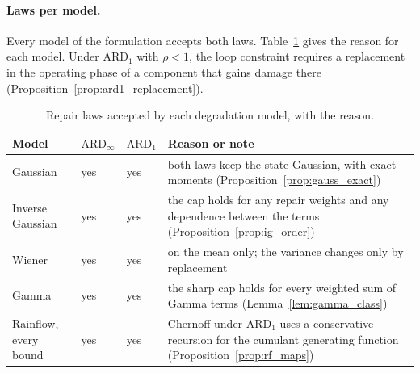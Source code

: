 \documentclass[11pt,a4paper]{article}
\theoremstyle{plain}
\theoremstyle{definition}
\theoremstyle{remark}
\begin{document}
\paragraph{Laws per model.}
Every model of the formulation accepts both laws.
Table~\ref{tab:laws_per_model} gives the reason for each model.
Under $\text{ARD}_1$ with $\rho < 1$, the loop constraint requires a replacement in the operating phase of a component that gains damage there (Proposition~\ref{prop:ard1_replacement}).

\begin{table}[htbp]
\centering
\caption{Repair laws accepted by each degradation model, with the reason.}
\label{tab:laws_per_model}
\small
\begin{tabular}{@{}lllp{7.4cm}@{}}
\toprule
\textbf{Model} & $\text{ARD}_\infty$ & $\text{ARD}_1$ & \textbf{Reason or note} \\
\midrule
Gaussian & yes & yes & both laws keep the state Gaussian, with exact moments (Proposition~\ref{prop:gauss_exact}) \\
Inverse Gaussian & yes & yes & the cap holds for any repair weights and any dependence between the terms (Proposition~\ref{prop:ig_order}) \\
Wiener & yes & yes & on the mean only; the variance changes only by replacement \\
Gamma & yes & yes & the sharp cap holds for every weighted sum of Gamma terms (Lemma~\ref{lem:gamma_class}) \\
Rainflow, every bound & yes & yes & Chernoff under $\text{ARD}_1$ uses a conservative recursion for the cumulant generating function (Proposition~\ref{prop:rf_maps}) \\
\bottomrule
\end{tabular}
\end{table}
\end{document}

